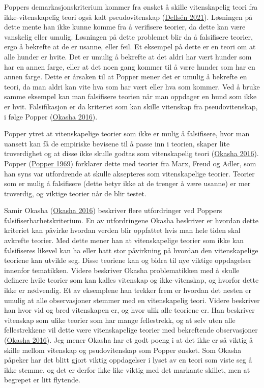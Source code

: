 \documentclass[
]{book}
\begin{document}
Poppers demarkasjonskriterium kommer fra ønsket å skille vitenskapelig
teori fra ikke-vitenskapelig teori også kalt pseudovitenskap
(\protect\hyperlink{ref-dellsuxe9n2021}{Dellsén 2021}). Løsningen på
dette mente han ikke kunne komme fra å verifisere teorier, da dette kan
være vanskelig eller umulig. Løsningen på dette problemet blir da å
falsifisere teorier, ergo å bekrefte at de er usanne, eller feil. Et
eksempel på dette er en teori om at alle hunder er hvite. Det er umulig
å bekrefte at det aldri har vært hunder som har en annen farge, eller at
det noen gang kommer til å være hunder som har en annen farge. Dette er
årsaken til at Popper mener det er umulig å bekrefte en teori, da man
aldri kan vite hva som har vært eller hva som kommer. Ved å bruke samme
eksempel kan man falsifisere teorien når man oppdager en hund som ikke
er hvit. Falsifikasjon er da kriteriet som kan skille vitenskap fra
pseudovitenskap, i følge Popper
(\protect\hyperlink{ref-okasha2016}{Okasha 2016}).

Popper ytret at vitenskapelige teorier som ikke er mulig å falsifisere,
hvor man uansett kan få de empiriske bevisene til å passe inn i teorien,
skaper lite troverdighet og at disse ikke skulle godtas som
vitenskapelig teori (\protect\hyperlink{ref-okasha2016}{Okasha 2016}).
Popper (\protect\hyperlink{ref-popper1969}{Popper 1969}) forklarer dette
med teorier fra Marx, Freud og Adler, som han syns var utfordrende at
skulle aksepteres som vitenskapelige teorier. Teorier som er mulig å
falsifisere (dette betyr ikke at de trenger å være usanne) er mer
troverdig, og viktige teorier når de blir testet.

Samir Okasha (\protect\hyperlink{ref-okasha2016}{Okasha 2016}) beskriver
flere utfordringer ved Poppers falsifiserbarhetskriterium. En av
utfordringene Okasha beskriver er hvordan dette kriteriet kan påvirke
hvordan verden blir oppfattet hvis man hele tiden skal avkrefte teorier.
Med dette mener han at vitenskapelige teorier som ikke kan falsifiseres
likevel kan ha eller hatt stor påvirkning på hvordan den vitenskapelige
teoriene kan utvikle seg. Disse teoriene kan og bidra til nye viktige
oppdagelser innenfor tematikken. Videre beskriver Okasha problematikken
med å skulle definere hvile teorier som kan kalles vitenskap og
ikke-vitenskap, og hvorfor dette ikke er nødvendig. Et av eksemplene han
trekker frem er hvordan det nesten er umulig at alle observasjoner
stemmer med en vitenskapelig teori. Videre beskriver han hvor vid og
bred vitenskapen er, og hvor ulik alle teoriene er. Han beskriver
vitenskap som ulike teorier som har mange fellestrekk, og at selv uten
alle fellestrekkene vil dette være vitenskapelige teorier med
bekreftende observasjoner (\protect\hyperlink{ref-okasha2016}{Okasha
2016}). Jeg mener Okasha har et godt poeng i at det ikke er så viktig å
skille mellom vitenskap og psudovitenskap som Popper ønsket. Som Okasha
påpeker har det blitt gjort viktig oppdagelser i lyset av en teori som
viste seg å ikke stemme, og det er derfor ikke like viktig med det
markante skillet, men at begrepet er litt flytende.
\end{document}
